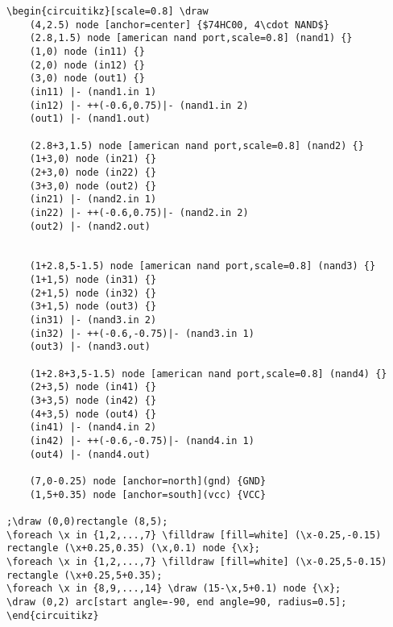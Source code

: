 \documentclass[a4paper,12pt,dvipsnames]{article}
\begin{document}
\begin{verbatim}
\begin{circuitikz}[scale=0.8] \draw
	(4,2.5) node [anchor=center] {$74HC00, 4\cdot NAND$}
	(2.8,1.5) node [american nand port,scale=0.8] (nand1) {}
	(1,0) node (in11) {}
	(2,0) node (in12) {}
	(3,0) node (out1) {}
	(in11) |- (nand1.in 1)
	(in12) |- ++(-0.6,0.75)|- (nand1.in 2)
	(out1) |- (nand1.out)

	(2.8+3,1.5) node [american nand port,scale=0.8] (nand2) {}
	(1+3,0) node (in21) {}
	(2+3,0) node (in22) {}
	(3+3,0) node (out2) {}
	(in21) |- (nand2.in 1)
	(in22) |- ++(-0.6,0.75)|- (nand2.in 2)
	(out2) |- (nand2.out)


	(1+2.8,5-1.5) node [american nand port,scale=0.8] (nand3) {}
	(1+1,5) node (in31) {}
	(2+1,5) node (in32) {}
	(3+1,5) node (out3) {}
	(in31) |- (nand3.in 2)
	(in32) |- ++(-0.6,-0.75)|- (nand3.in 1)
	(out3) |- (nand3.out)

	(1+2.8+3,5-1.5) node [american nand port,scale=0.8] (nand4) {}
	(2+3,5) node (in41) {}
	(3+3,5) node (in42) {}
	(4+3,5) node (out4) {}
	(in41) |- (nand4.in 2)
	(in42) |- ++(-0.6,-0.75)|- (nand4.in 1)
	(out4) |- (nand4.out)

	(7,0-0.25) node [anchor=north](gnd) {GND}
	(1,5+0.35) node [anchor=south](vcc) {VCC}

;\draw (0,0)rectangle (8,5);
\foreach \x in {1,2,...,7} \filldraw [fill=white] (\x-0.25,-0.15) rectangle (\x+0.25,0.35) (\x,0.1) node {\x};
\foreach \x in {1,2,...,7} \filldraw [fill=white] (\x-0.25,5-0.15) rectangle (\x+0.25,5+0.35);
\foreach \x in {8,9,...,14} \draw (15-\x,5+0.1) node {\x};
\draw (0,2) arc[start angle=-90, end angle=90, radius=0.5];
\end{circuitikz}
\end{verbatim}
\end{document}
